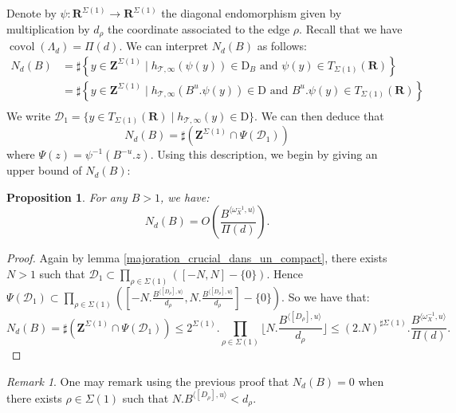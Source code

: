 \documentclass{proc-l}
\newcommand{\R}{\mathbf{R}}
\newcommand{\Z}{\mathbf{Z}}
\DeclareMathOperator{\covol}{covol}
\newcommand{\stackT}{\mathcal{T}}
\newcommand{\w}{\omega}
\newtheorem{prop}[theorem]{Proposition}
\theoremstyle{definition}
\theoremstyle{remark}
\newtheorem{remark}[theorem]{Remark}
\numberwithin{equation}{section}
\begin{document}
Denote by $\psi : \R^{\Sigma(1)} \rightarrow \R^{\Sigma(1)}$ the diagonal endomorphism given by multiplication by $d_{\rho}$ the coordinate associated to the edge $\rho$. Recall that we have $\covol(\Lambda_d) = \Pi(d)$. We can interpret $N_d(B)$ as follows:
    \begin{align*}
        N_d(B) &= \sharp \left\{ y \in \Z^{\Sigma(1)} \mid h_{\stackT,\infty}\left( \psi(y)  \right) \in \mathrm{D}_B \text{ and } \psi(y) \in T_{\Sigma(1)}(\R) \right\} \\
        &= \sharp \left\{ y \in \Z^{\Sigma(1)} \mid h_{\stackT,\infty}\left( B^{u}. \psi(y) \right) \in \mathrm{D} \text{ and } B^{u}. \psi(y) \in T_{\Sigma(1)}(\R) \right\} \\
    \end{align*}
We write $\mathcal{D}_1 = \{ y \in T_{\Sigma(1)}(\R) \mid h_{\stackT,\infty}(y) \in \mathrm{D} \}$. We can then deduce that $$N_d(B) = \sharp \left( \Z^{\Sigma(1)} \cap \Psi(\mathcal{D}_1) \right)$$ where $\Psi(z) = \psi^{-1} ( B^{-u}. z ) $. Using this description, we begin by giving an upper bound of $N_d(B)$:

\begin{prop}\label{upper_bound_N_d(B)}
    For any $B > 1$, we have:
    $$N_d(B) = O\left( \frac{B^{\langle \w_{X}^{-1} , u \rangle}}{\Pi(d)} \right) .$$
\end{prop}

\begin{proof}
    Again by lemma \ref{majoration_crucial_dans_un_compact}, there exists $N > 1$ such that $\mathcal{D}_1 \subset \prod\limits_{\rho \in \Sigma(1)} \left( [-N,N] - \{0\} \right)$. Hence $\Psi(\mathcal{D}_1) \subset  \prod\limits_{\rho \in \Sigma(1)} \left( \left[ -N.\frac{B^{\langle [D_{\rho}] , u \rangle}}{d_{\rho}},N.\frac{B^{\langle [D_{\rho}] , u \rangle}}{d_{\rho}} \right] - \{0\} \right)$. So we have that:
    $$N_d(B) = \sharp(\Z^{\Sigma(1)} \cap \Psi(\mathcal{D}_1)) \leqslant 2^{\Sigma(1)}.\prod\limits_{\rho \in \Sigma(1)} \Big\lfloor N.\frac{B^{\langle [D_{\rho}] , u \rangle}}{d_{\rho}} \Big\rfloor \leqslant (2.N)^{\sharp \Sigma(1)} . \frac{B^{\langle \w_X^{-1},u\rangle}}{\Pi(d)} .$$
\end{proof}

\begin{remark}\label{remark_nulitte_N_d(B)}
    One may remark using the previous proof that $N_d(B) = 0$ when there exists $\rho \in \Sigma(1)$ such that $N . B^{\langle [D_{\rho}] , u \rangle} < d_{\rho}$.
\end{remark}
\end{document}
